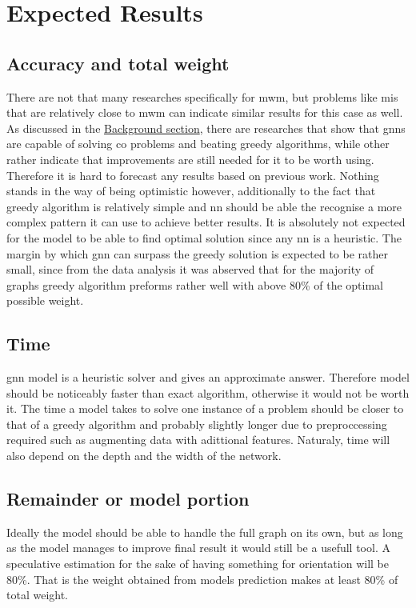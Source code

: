 \section{Expected Results}

\subsection{Accuracy and total weight}

There are not that many researches specifically for \gls{mwm}, but problems like \gls{mis} that are relatively close to \gls{mwm} can indicate similar results for this case as well. As discussed in the \hyperref[sec:background]{Background section}, there are researches that show that \gls{gnn}s are capable of solving \gls{co} problems and beating greedy algorithms, while other rather indicate that improvements are still needed for it to be worth using. Therefore it is hard to forecast any results based on previous work. Nothing stands in the way of being optimistic however, additionally to the fact that greedy algorithm is relatively simple and \gls{nn} should be able the recognise a more complex pattern it can use to achieve better results. It is absolutely not expected for the model to be able to find optimal solution since any \gls{nn} is a heuristic. The margin by which \gls{gnn} can surpass the greedy solution is expected to be rather small, since from the data analysis it was abserved that for the majority of graphs greedy algorithm preforms rather well with above 80\% of the optimal possible weight.

\subsection{Time}

\gls{gnn} model is a heuristic solver and gives an approximate answer. Therefore model should be noticeably faster than exact algorithm, otherwise it would not be worth it. The time a model takes to solve one instance of a problem should be closer to that of a greedy algorithm and probably slightly longer due to preproccessing required such as augmenting data with adittional features. Naturaly, time will also depend on the depth and the width of the network.

\subsection{Remainder or model portion}

Ideally the model should be able to handle the full graph on its own, but as long as the model manages to improve final result it would still be a usefull tool. A speculative estimation for the sake of having something for orientation will be 80\%. That is the weight obtained from models prediction makes at least 80\% of total weight.

